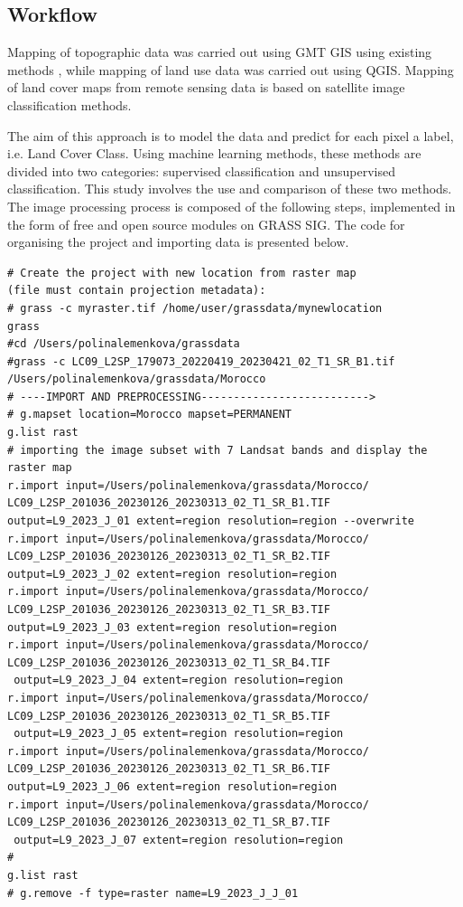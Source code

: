 \documentclass[geomatics,article,submit,pdftex,moreauthors]{Definitions/mdpi}
\begin{document}
\subsection{Workflow}

Mapping of topographic data was carried out using GMT GIS using existing methods \cite{Lemenkova202221,Lemenkova202217}, while mapping of land use data was carried out using QGIS. Mapping of land cover maps from remote sensing data is based on satellite image classification methods.

The aim of this approach is to model the data and predict for each pixel a label, i.e. Land Cover Class. Using machine learning methods, these methods are divided into two categories: supervised classification and unsupervised classification. This study involves the use and comparison of these two methods. The image processing process is composed of the following steps, implemented in the form of free and open source modules on GRASS SIG. The code for organising the project and importing data is presented below.

\begin{footnotesize}
\begin{verbatim}
# Create the project with new location from raster map 
(file must contain projection metadata):
# grass -c myraster.tif /home/user/grassdata/mynewlocation
grass
#cd /Users/polinalemenkova/grassdata
#grass -c LC09_L2SP_179073_20220419_20230421_02_T1_SR_B1.tif 
/Users/polinalemenkova/grassdata/Morocco
# ----IMPORT AND PREPROCESSING-------------------------->
# g.mapset location=Morocco mapset=PERMANENT
g.list rast
# importing the image subset with 7 Landsat bands and display the raster map
r.import input=/Users/polinalemenkova/grassdata/Morocco/
LC09_L2SP_201036_20230126_20230313_02_T1_SR_B1.TIF 
output=L9_2023_J_01 extent=region resolution=region --overwrite
r.import input=/Users/polinalemenkova/grassdata/Morocco/
LC09_L2SP_201036_20230126_20230313_02_T1_SR_B2.TIF 
output=L9_2023_J_02 extent=region resolution=region
r.import input=/Users/polinalemenkova/grassdata/Morocco/
LC09_L2SP_201036_20230126_20230313_02_T1_SR_B3.TIF 
output=L9_2023_J_03 extent=region resolution=region
r.import input=/Users/polinalemenkova/grassdata/Morocco/
LC09_L2SP_201036_20230126_20230313_02_T1_SR_B4.TIF
 output=L9_2023_J_04 extent=region resolution=region
r.import input=/Users/polinalemenkova/grassdata/Morocco/
LC09_L2SP_201036_20230126_20230313_02_T1_SR_B5.TIF
 output=L9_2023_J_05 extent=region resolution=region
r.import input=/Users/polinalemenkova/grassdata/Morocco/
LC09_L2SP_201036_20230126_20230313_02_T1_SR_B6.TIF 
output=L9_2023_J_06 extent=region resolution=region
r.import input=/Users/polinalemenkova/grassdata/Morocco/
LC09_L2SP_201036_20230126_20230313_02_T1_SR_B7.TIF
 output=L9_2023_J_07 extent=region resolution=region
#
g.list rast
# g.remove -f type=raster name=L9_2023_J_J_01
\end{verbatim}
\end{footnotesize}
\end{document}
